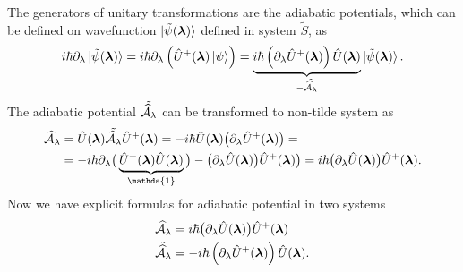 




The generators of unitary transformations are the adiabatic potentials, which can be defined on wavefunction $\ket{\tilde\psi(\llambda)}$ defined in system $\tilde S$, as
\begin{equation}
    i\hbar\partial_\lambda \ket{\tilde{\psi}(\llambda)} = i\hbar \partial_\lambda\left(\U^+(\llambda)\ket{\psi} \right)= \underbrace{i\hbar\left(\partial_\lambda \U^+(\llambda)\right)\U(\llambda)}_{-\tilde{\AA_\lambda}}\ket{\tilde{\psi}(\llambda)}.
\end{equation}
The adiabatic potential $\tilde{\AA_\lambda}$ can be transformed to non-tilde system as
\begin{equation}
    \begin{split}
        \AA_\lambda&=\U(\llambda)\tilde{\AA_\lambda}\U^+(\llambda) = -i\hbar\U(\llambda)\big(\partial_\lambda \U^+(\llambda)\big) =\\
        &= -i\hbar\partial_\lambda\big(\underbrace{\U^+(\llambda)\U(\llambda)}_{\mathds{1}}\big)-\big(\partial_\lambda \U(\llambda)\big)\U^+(\llambda) \big) =i\hbar \big(\partial_\lambda \U(\llambda)\big)\U^+(\llambda).
    \end{split}
\end{equation}
Now we have explicit formulas for adiabatic potential in two systems
\begin{align}
    \AA_\lambda&=i\hbar \big(\partial_\lambda \U(\llambda)\big)\U^+(\llambda)
    \label{eq:adiabaticPotential}\\
    \tilde{\AA_\lambda} &= -i\hbar\left(\partial_\lambda \U^+(\llambda)\right)\U(\llambda).
    \label{eq:adiabaticPotentialTilde}
\end{align}

